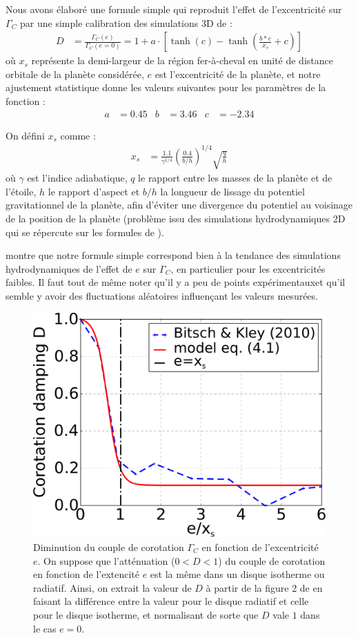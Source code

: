 Nous avons élaboré une formule simple qui reproduit l'effet de l'excentricité sur $\Gamma_C$ par une simple calibration des simulations 3D de \cite{bitsch2010orbital} : 
\begin{align}
D &= \frac{\Gamma_C(e)}{\Gamma_C (e=0)} = 1 + a \cdot \left[\tanh(c) - \tanh\left(\frac{b * e}{x_s}+c\right)\right]\label{eq:eccentricity-influence}
\end{align}
où $x_s$ représente la demi-largeur de la région fer-à-cheval en unité de distance orbitale de la planète considérée, $e$ est l'excentricité de la planète, et notre ajustement statistique donne les valeurs suivantes pour les paramètres de la fonction :
\begin{align}
a &= 0.45 & b &= 3.46 & c &= -2.34
\end{align}

On défini $x_s$ comme \citep[voir][eq. 44]{paardekooper2010torque} :
\begin{align}
x_s &= \frac{1.1}{\gamma^{1/4}} \left(\frac{0.4}{b/h}\right)^{1/4} \sqrt{\frac{q}{h}}
\end{align}
où $\gamma$ est l'indice adiabatique, $q$ le rapport entre les masses de la planète et de l'étoile, $h$ le rapport d'aspect et $b/h$ la longueur de lissage du potentiel gravitationnel de la planète, afin d'éviter une divergence du potentiel au voisinage de la position de la planète (problème issu des simulations hydrodynamiques 2D qui se répercute sur les formules de \cite{paardekooper2011torque}).

 montre que notre formule simple  correspond bien à la tendance des simulations hydrodynamiques de l'effet de $e$ sur $\Gamma_C$, en particulier pour les excentricités faibles. Il faut tout de même noter qu'il y a peu de points \og expérimentaux\fg et qu'il semble y avoir des fluctuations aléatoires influençant les valeurs mesurées.

\begin{figure}[htb]
\centering
\includegraphics[width=0.49\linewidth]{figure/shifted/corotation_damping_profile.pdf}
\caption{Diminution du couple de corotation $\Gamma_C$ en fonction de l'excentricité $e$. On suppose que l'atténuation ($0<D<1$) du couple de corotation en fonction de l'extencité $e$ est la même dans un disque isotherme ou radiatif. Ainsi, on extrait la valeur de $D$ à partir de la figure 2 de \cite{bitsch2010orbital} en faisant la différence entre la valeur pour le disque radiatif et celle pour le disque isotherme, et normalisant de sorte que $D$ vale $1$ dans le cas $e=0$.}\label{fig:shifted_CZ_D_profile}
\end{figure}

